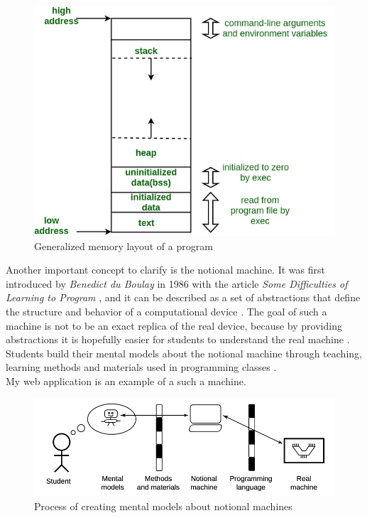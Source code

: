 \documentclass[]{usiinfbachelorproject}
\begin{document}
\begin{figure}[h!]
\includegraphics[scale=0.4]{figures/memory_layout.jpg}
\centering
\caption {Generalized memory layout of a program}
\end{figure}
 
\noindent Another important concept to clarify is the notional machine. It was first introduced by \emph{Benedict du Boulay} in 1986 with the article \emph{Some Difficulties of Learning to Program} \cite{boulay}, and it can be described as a set of abstractions that define the structure and behavior of a computational device \cite{guzdial_et_al:DR:2019:11627}. The goal of such a machine is not to be an exact replica of the real device, because by providing abstractions it is hopefully easier for students to understand the real machine \cite{7743153}. Students build their mental models about the notional machine through teaching, learning methods and materials used in programming classes \cite{HIDALGO-CESPEDES2016}.\\
My web application is an example of a such a machine.
 
\begin{figure}[h!]
\includegraphics[scale=0.8]{figures/notional_machine.png}
\centering
\caption {Process of creating mental models about notional machines}
\end{figure}
 
\end{document}
